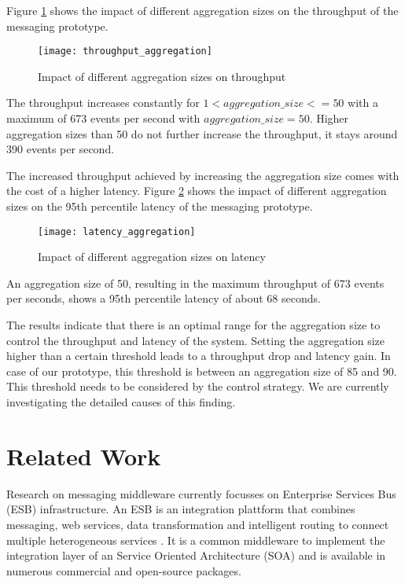 Figure \ref{fig:throughput_aggregation} shows the impact of different aggregation sizes on the throughput of the messaging prototype.
\begin{figure}[htbp]
	\centering
	\texttt{[image: throughput\_aggregation]}
	\caption{Impact of different aggregation sizes on throughput}
	\label{fig:throughput_aggregation}
\end{figure}
The throughput increases constantly for $1<aggregation\_size<=50$ with a maximum of 673 events per second with $aggregation\_size=50$. Higher aggregation sizes than 50 do not further increase the throughput, it stays around 390 events per second.

The increased throughput achieved by increasing the aggregation size comes with the cost of a higher latency. Figure \ref{fig:latency_aggregation} shows the impact of different aggregation sizes on the 95th percentile latency of the messaging prototype. 
\begin{figure}[htbp]
	\centering
	\texttt{[image: latency\_aggregation]}
	\caption{Impact of different aggregation sizes on latency}
	\label{fig:latency_aggregation}
\end{figure}

An aggregation size of 50, resulting in the maximum throughput of 673 events per seconds, shows a 95th percentile latency of about 68 seconds.

The results indicate that there is an optimal range for the aggregation size to control the throughput and latency of the system. Setting the aggregation size higher than a certain threshold leads to a throughput drop and latency gain. In case of our prototype, this threshold is between an aggregation size of 85 and 90. This threshold needs to be considered by the control strategy. We are currently investigating the detailed causes of this finding.

\section{Related Work}\label{sec:related_work}
Research on messaging middleware currently focusses on Enterprise Services Bus (ESB) infrastructure. An ESB is an integration plattform that combines messaging, web services, data transformation and intelligent routing to connect multiple heterogeneous services \citep{Chappell:2004jo}. It is a common middleware to implement the integration layer of an Service Oriented Architecture (SOA) and is available in numerous commercial and open-source packages.

